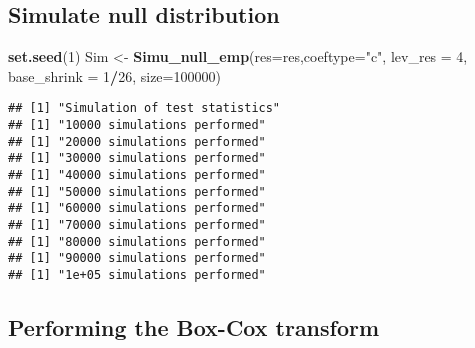 \documentclass[
]{article}
\newenvironment{Shaded}{\begin{snugshade}}{\end{snugshade}}
\newcommand{\DataTypeTok}[1]{\textcolor[rgb]{0.13,0.29,0.53}{#1}}
\newcommand{\DecValTok}[1]{\textcolor[rgb]{0.00,0.00,0.81}{#1}}
\newcommand{\KeywordTok}[1]{\textcolor[rgb]{0.13,0.29,0.53}{\textbf{#1}}}
\newcommand{\NormalTok}[1]{#1}
\newcommand{\OperatorTok}[1]{\textcolor[rgb]{0.81,0.36,0.00}{\textbf{#1}}}
\newcommand{\StringTok}[1]{\textcolor[rgb]{0.31,0.60,0.02}{#1}}
\begin{document}
\hypertarget{simulate-null-distribution}{%
\subsection{Simulate null
distribution}\label{simulate-null-distribution}}

\begin{Shaded}
\begin{Highlighting}[]
\KeywordTok{set.seed}\NormalTok{(}\DecValTok{1}\NormalTok{)}
\NormalTok{Sim <-}\StringTok{ }\KeywordTok{Simu_null_emp}\NormalTok{(}\DataTypeTok{res=}\NormalTok{res,}\DataTypeTok{coeftype=}\StringTok{"c"}\NormalTok{,}
                       \DataTypeTok{lev_res =} \DecValTok{4}\NormalTok{,}
                       \DataTypeTok{base_shrink =} \DecValTok{1}\OperatorTok{/}\DecValTok{26}\NormalTok{,}
                       \DataTypeTok{size=}\DecValTok{100000}\NormalTok{)}
\end{Highlighting}
\end{Shaded}

\begin{verbatim}
## [1] "Simulation of test statistics"
## [1] "10000 simulations performed"
## [1] "20000 simulations performed"
## [1] "30000 simulations performed"
## [1] "40000 simulations performed"
## [1] "50000 simulations performed"
## [1] "60000 simulations performed"
## [1] "70000 simulations performed"
## [1] "80000 simulations performed"
## [1] "90000 simulations performed"
## [1] "1e+05 simulations performed"
\end{verbatim}

\hypertarget{performing-the-box-cox-transform}{%
\subsection{Performing the Box-Cox
transform}\label{performing-the-box-cox-transform}}
\end{document}
